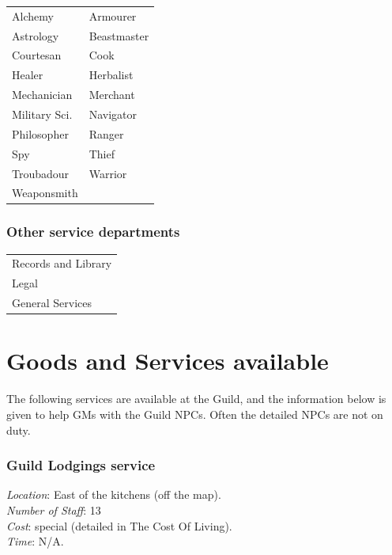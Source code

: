 \documentclass[twoside,a4paper]{article}
\begin{document}
\begin{multicols}{2}
\begin{tabular}{ll}
Alchemy		& Armourer \\
Astrology	& Beastmaster \\
Courtesan	& Cook \\
Healer		& Herbalist \\
Mechanician	& Merchant \\
Military Sci.	& Navigator \\
Philosopher	& Ranger \\
Spy		& Thief \\
Troubadour	& Warrior \\
Weaponsmith \\
\end{tabular}

\subsubsection{Other service departments}

\begin{tabular}{l}
Records and Library \\
Legal \\
General Services \\
\end{tabular}

\raggedcolumns
\columnbreak

%
%

\section{Goods and Services available}


The following services are available at the Guild, and the information
below is given to help GMs with the Guild NPCs.  Often the detailed
NPCs are not on duty.

\subsubsection{Guild Lodgings service}

\begin{flushleft}
\emph{Location}: East of the kitchens (off the map). \\
\emph{Number of Staff}: 13 \\
\emph{Cost}: special (detailed in The Cost Of Living). \\
\emph{Time}: N/A. \\
\end{flushleft}


\end{multicols}
\end{document}
